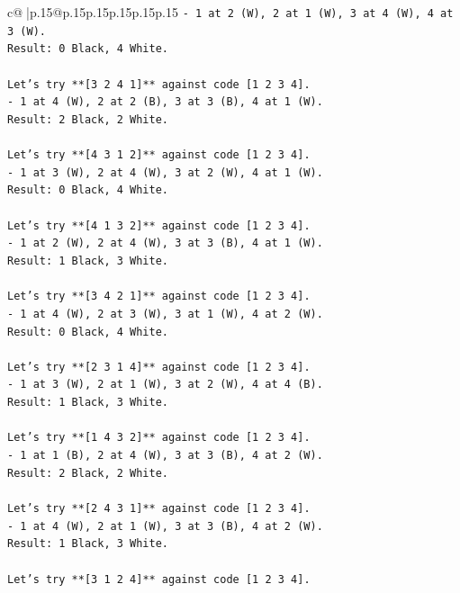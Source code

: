 \documentclass{article}
\begin{document}
{\begin{supertabular}{c@{$\;$}|p{.15\linewidth}@{}p{.15\linewidth}p{.15\linewidth}p{.15\linewidth}p{.15\linewidth}p{.15\linewidth}}
{{{\texttt{{-} 1 at 2 (W), 2 at 1 (W), 3 at 4 (W), 4 at 3 (W).} \\
\texttt{Result: 0 Black, 4 White.} \\
\\ 
\texttt{Let's try **{[}3 2 4 1{]}** against code {[}1 2 3 4{]}.} \\
\texttt{{-} 1 at 4 (W), 2 at 2 (B), 3 at 3 (B), 4 at 1 (W).} \\
\texttt{Result: 2 Black, 2 White.} \\
\\ 
\texttt{Let's try **{[}4 3 1 2{]}** against code {[}1 2 3 4{]}.} \\
\texttt{{-} 1 at 3 (W), 2 at 4 (W), 3 at 2 (W), 4 at 1 (W).} \\
\texttt{Result: 0 Black, 4 White.} \\
\\ 
\texttt{Let's try **{[}4 1 3 2{]}** against code {[}1 2 3 4{]}.} \\
\texttt{{-} 1 at 2 (W), 2 at 4 (W), 3 at 3 (B), 4 at 1 (W).} \\
\texttt{Result: 1 Black, 3 White.} \\
\\ 
\texttt{Let's try **{[}3 4 2 1{]}** against code {[}1 2 3 4{]}.} \\
\texttt{{-} 1 at 4 (W), 2 at 3 (W), 3 at 1 (W), 4 at 2 (W).} \\
\texttt{Result: 0 Black, 4 White.} \\
\\ 
\texttt{Let's try **{[}2 3 1 4{]}** against code {[}1 2 3 4{]}.} \\
\texttt{{-} 1 at 3 (W), 2 at 1 (W), 3 at 2 (W), 4 at 4 (B).} \\
\texttt{Result: 1 Black, 3 White.} \\
\\ 
\texttt{Let's try **{[}1 4 3 2{]}** against code {[}1 2 3 4{]}.} \\
\texttt{{-} 1 at 1 (B), 2 at 4 (W), 3 at 3 (B), 4 at 2 (W).} \\
\texttt{Result: 2 Black, 2 White.} \\
\\ 
\texttt{Let's try **{[}2 4 3 1{]}** against code {[}1 2 3 4{]}.} \\
\texttt{{-} 1 at 4 (W), 2 at 1 (W), 3 at 3 (B), 4 at 2 (W).} \\
\texttt{Result: 1 Black, 3 White.} \\
\\ 
\texttt{Let's try **{[}3 1 2 4{]}** against code {[}1 2 3 4{]}.} \\
}}}
\end{supertabular}}
\end{document}
